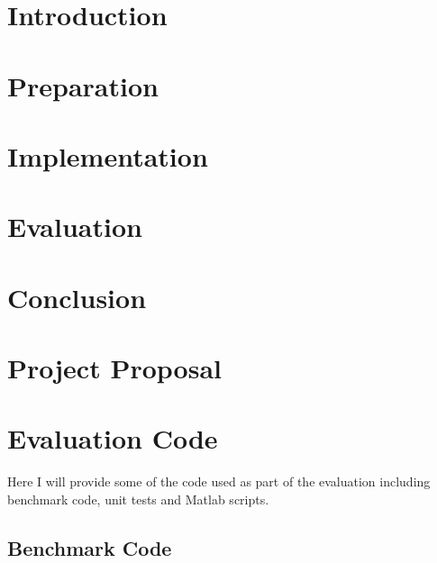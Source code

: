 \documentclass[12pt,a4paper,twoside,openright]{report}
\begin{document}
\pagestyle{headings}

\chapter{Introduction} \label{introduction}


\chapter{Preparation}


\chapter{Implementation}


\chapter{Evaluation} \label{cpt:eval}


\chapter{Conclusion} 





\appendix


\chapter{Project Proposal}
\label{appendix:initialproposal}


\chapter{Evaluation Code}
\label{appendix:evaluation}

Here I will provide some of the code used as part of the evaluation including benchmark code, unit tests and Matlab scripts.

\section{Benchmark Code}
\end{document}
